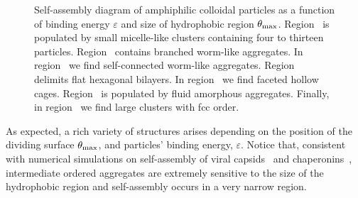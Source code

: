 \begin{figure}
\begin{center}
   \end{center}
   \caption[Phase diagram for amphiphilic colloidal particles]{\label{fig:patchsize}Self-assembly diagram of amphiphilic colloidal particles as a function of binding energy 
   $\varepsilon$ and size of  hydrophobic region  $\theta_{\rm max} $. Region~ is populated by small micelle-like clusters containing
   four to thirteen particles. Region~ contains branched  worm-like aggregates. In region~ we find self-connected worm-like aggregates.
   Region~ delimits flat hexagonal bilayers. In region~ we find faceted hollow cages. Region~ is populated by fluid amorphous 
   aggregates. Finally, in region~ we find large clusters with fcc order.}
\end{figure} 

As expected, a rich variety of structures arises depending on the position of the dividing surface $\theta_{\rm max}$, and particles' binding energy, $\varepsilon$. 
Notice that, consistent with numerical simulations on self-assembly of viral capsids~\cite{chandler} and chaperonins~\cite{geissler}, intermediate ordered  aggregates are extremely sensitive to the size of the hydrophobic region and self-assembly occurs in a very narrow region.

